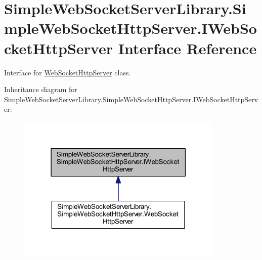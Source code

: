 \hypertarget{interface_simple_web_socket_server_library_1_1_simple_web_socket_http_server_1_1_i_web_socket_http_server}{}\section{Simple\+Web\+Socket\+Server\+Library.\+Simple\+Web\+Socket\+Http\+Server.\+I\+Web\+Socket\+Http\+Server Interface Reference}
\label{interface_simple_web_socket_server_library_1_1_simple_web_socket_http_server_1_1_i_web_socket_http_server}


Interface for \mbox{\hyperlink{class_simple_web_socket_server_library_1_1_simple_web_socket_http_server_1_1_web_socket_http_server}{Web\+Socket\+Http\+Server}} class.  




Inheritance diagram for Simple\+Web\+Socket\+Server\+Library.\+Simple\+Web\+Socket\+Http\+Server.\+I\+Web\+Socket\+Http\+Server\+:
\nopagebreak
\begin{figure}[H]
\begin{center}
\leavevmode
\includegraphics[width=279pt]{interface_simple_web_socket_server_library_1_1_simple_web_socket_http_server_1_1_i_web_socket_http_server__inherit__graph}
\end{center}
\end{figure}
